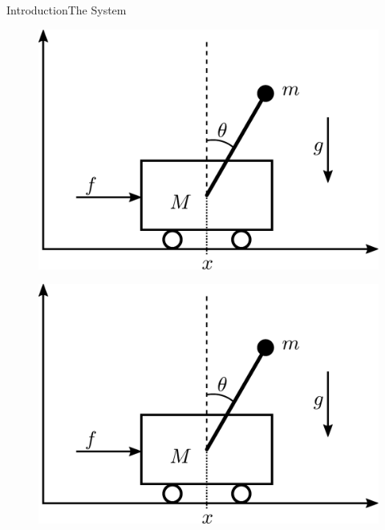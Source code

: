 \begin{frame}{Introduction}{The System}

\begin{figure}[H]
  \includegraphics[width=.2\textwidth]{figures/system}
\end{figure}














%
%  
%  
%  

{
      \begin{figure}[H]
        \includegraphics[width=1\textwidth]{figures/system}
      \end{figure}
}


\end{frame}
